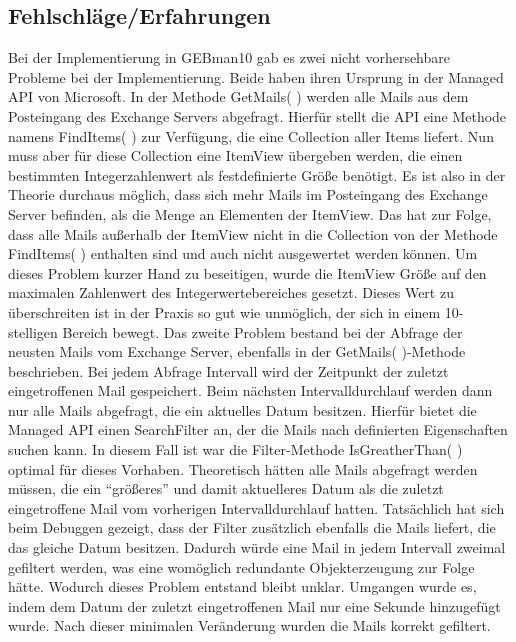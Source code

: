 \subsection{Fehlschläge/Erfahrungen}
\noindent
Bei der Implementierung in GEBman10 gab es zwei nicht vorhersehbare Probleme bei der Implementierung. Beide haben ihren Ursprung in der Managed API von Microsoft. In der Methode GetMails( ) werden alle Mails aus dem Posteingang des Exchange Servers abgefragt. Hierfür stellt die API eine Methode namens FindItems( ) zur Verfügung, die eine Collection aller Items liefert. Nun muss aber für diese Collection eine ItemView übergeben werden, die einen bestimmten Integerzahlenwert als festdefinierte Größe benötigt. Es ist also in der Theorie durchaus möglich, dass sich mehr Mails im Posteingang des Exchange Server befinden, als die Menge an Elementen der ItemView. Das hat zur Folge, dass alle Mails außerhalb der ItemView nicht in die Collection von der Methode FindItems( ) enthalten sind und auch nicht ausgewertet werden können. Um dieses Problem kurzer Hand zu beseitigen, wurde die ItemView Größe auf den maximalen Zahlenwert des Integerwertebereiches gesetzt. Dieses Wert zu überschreiten ist in der Praxis so gut wie unmöglich, der sich in einem 10-stelligen Bereich bewegt.\newline
Das zweite Problem bestand bei der Abfrage der neusten Mails vom Exchange Server, ebenfalls in der GetMails( )-Methode beschrieben. Bei jedem Abfrage Intervall wird der Zeitpunkt der zuletzt eingetroffenen Mail gespeichert. Beim nächsten Intervalldurchlauf werden dann nur alle Mails abgefragt, die ein aktuelles Datum besitzen. Hierfür bietet die Managed API einen SearchFilter an, der die Mails nach definierten Eigenschaften suchen kann. In diesem Fall ist war die Filter-Methode IsGreatherThan( ) optimal für dieses Vorhaben. Theoretisch hätten alle Mails abgefragt werden müssen, die ein \enquote{größeres} und damit aktuelleres Datum als die zuletzt eingetroffene Mail vom vorherigen Intervalldurchlauf hatten. Tatsächlich hat sich beim Debuggen gezeigt, dass der Filter zusätzlich ebenfalls die Mails liefert, die das gleiche Datum besitzen. Dadurch würde eine Mail in jedem Intervall zweimal gefiltert werden, was eine womöglich redundante Objekterzeugung zur Folge hätte. Wodurch dieses Problem entstand bleibt unklar. Umgangen wurde es, indem dem Datum der zuletzt eingetroffenen Mail nur eine Sekunde hinzugefügt wurde. Nach dieser minimalen Veränderung wurden die Mails korrekt gefiltert.

